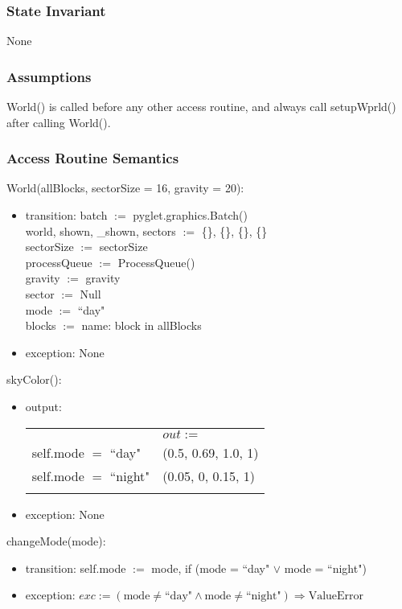 \documentclass{article}
\begin{document}
\subsubsection {State Invariant}
None

\subsubsection {Assumptions}
World() is called before any other access routine, and always call setupWprld() after calling World().

\subsubsection {Access Routine Semantics}
\noindent World(allBlocks, sectorSize = 16, gravity = 20):
\begin{itemize}
\item transition: batch $:=$ pyglet.graphics.Batch()\\
    world, shown, \_shown, sectors $:=$ \{\}, \{\}, \{\}, \{\}\\
    sectorSize $:=$ sectorSize\\
    processQueue $:=$ ProcessQueue()\\
    gravity $:=$ gravity\\
    sector $:=$ Null\\
    mode $:=$ ``day"\\
    blocks $:=$ {name: block} in allBlocks
\item exception: None
\end{itemize}\vspace{6mm}

\noindent skyColor():
\begin{itemize}
\item output: 

\begin{tabular}{|l|l|}
\hhline{~|-|}
\multicolumn{1}{r|}{} & \multicolumn{1}{l|}{$out :=$}\\
\hhline{|-|-|}
self.mode $=$ ``day" & (0.5, 0.69, 1.0, 1) \\
\hhline{|-|-|}
self.mode $=$ ``night" & (0.05, 0, 0.15, 1) \\
\hhline{|-|-|}
\end{tabular}

\item exception: None 
\end{itemize}\vspace{6mm}

\noindent changeMode(mode):
\begin{itemize}
\item transition: self.mode $:=$ mode, if (mode = ``day" $\lor$ mode = ``night")
\item exception: $exc := (\text{mode} \neq \text{``day"} \land \text{mode} \neq \text{``night"}) \Rightarrow \text{ValueError}$
\end{itemize}\vspace{6mm}
\end{document}
